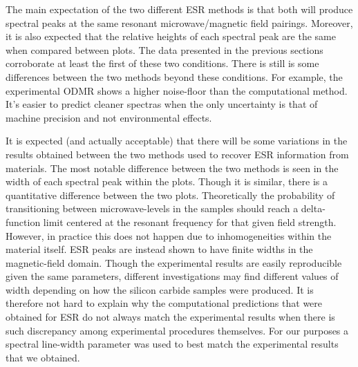 \documentclass[oneside, noacknowlegments]{BYUPhys}
\begin{document}
The main expectation of the two different ESR methods is that both will produce spectral peaks at the same resonant microwave/magnetic field pairings. Moreover, it is also expected that the relative heights of each spectral peak are the same when compared between plots. The data presented in the previous sections corroborate at least the first of these two conditions. There is still is some differences between the two methods beyond these conditions. For example, the experimental ODMR shows a higher noise-floor than the computational method. It's easier to predict cleaner spectras when the only uncertainty is that of machine precision and not environmental effects.

It is expected (and actually acceptable) that there will be some variations in the results obtained between the two methods used to recover ESR information from materials. The most notable difference between the two methods is seen in the width of each spectral peak within the plots. Though it is similar, there is a quantitative difference between the two plots. Theoretically the probability of transitioning between microwave-levels in the samples should reach a delta-function limit centered at the resonant frequency for that given field strength. However, in practice this does not happen due to inhomogeneities within the material itself. ESR peaks are instead shown to have finite widths in the magnetic-field domain. Though the experimental results are easily reproducible given the same parameters, different investigations may find different values of width depending on how the silicon carbide samples were produced. It is therefore not hard to explain why the computational predictions that were obtained for ESR do not always match the experimental results when there is such discrepancy among experimental procedures themselves. For our purposes a spectral line-width parameter was used to best match the experimental results that we obtained.
\end{document}
